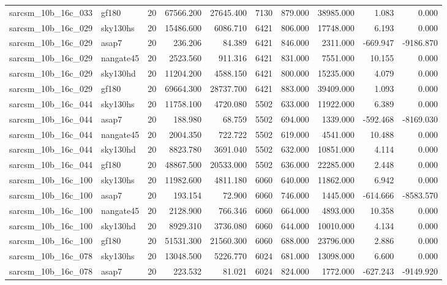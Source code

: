 \begin{longtable}{llrrrrrrrr}
sarcsm\_10b\_16c\_033 & gf180 & 20 & 67566.200 & 27645.400 & 7130 & 879.000 & 38985.000 & 1.083 & 0.000 \\
sarcsm\_10b\_16c\_029 & sky130hs & 20 & 15486.600 & 6086.710 & 6421 & 806.000 & 17748.000 & 6.193 & 0.000 \\
sarcsm\_10b\_16c\_029 & asap7 & 20 & 236.206 & 84.389 & 6421 & 846.000 & 2311.000 & -669.947 & -9186.870 \\
sarcsm\_10b\_16c\_029 & nangate45 & 20 & 2523.560 & 911.316 & 6421 & 831.000 & 7551.000 & 10.155 & 0.000 \\
sarcsm\_10b\_16c\_029 & sky130hd & 20 & 11204.200 & 4588.150 & 6421 & 800.000 & 15235.000 & 4.079 & 0.000 \\
sarcsm\_10b\_16c\_029 & gf180 & 20 & 69664.300 & 28737.700 & 6421 & 883.000 & 39409.000 & 1.093 & 0.000 \\
sarcsm\_10b\_16c\_044 & sky130hs & 20 & 11758.100 & 4720.080 & 5502 & 633.000 & 11922.000 & 6.389 & 0.000 \\
sarcsm\_10b\_16c\_044 & asap7 & 20 & 188.980 & 68.759 & 5502 & 694.000 & 1339.000 & -592.468 & -8169.030 \\
sarcsm\_10b\_16c\_044 & nangate45 & 20 & 2004.350 & 722.722 & 5502 & 619.000 & 4541.000 & 10.488 & 0.000 \\
sarcsm\_10b\_16c\_044 & sky130hd & 20 & 8823.780 & 3691.040 & 5502 & 632.000 & 10851.000 & 4.114 & 0.000 \\
sarcsm\_10b\_16c\_044 & gf180 & 20 & 48867.500 & 20533.000 & 5502 & 636.000 & 22285.000 & 2.448 & 0.000 \\
sarcsm\_10b\_16c\_100 & sky130hs & 20 & 11982.600 & 4811.180 & 6060 & 640.000 & 11862.000 & 6.942 & 0.000 \\
sarcsm\_10b\_16c\_100 & asap7 & 20 & 193.154 & 72.900 & 6060 & 746.000 & 1445.000 & -614.666 & -8583.570 \\
sarcsm\_10b\_16c\_100 & nangate45 & 20 & 2128.900 & 766.346 & 6060 & 664.000 & 4893.000 & 10.358 & 0.000 \\
sarcsm\_10b\_16c\_100 & sky130hd & 20 & 8929.310 & 3736.080 & 6060 & 644.000 & 10010.000 & 4.134 & 0.000 \\
sarcsm\_10b\_16c\_100 & gf180 & 20 & 51531.300 & 21560.300 & 6060 & 688.000 & 23796.000 & 2.886 & 0.000 \\
sarcsm\_10b\_16c\_078 & sky130hs & 20 & 13048.500 & 5226.770 & 6024 & 681.000 & 13098.000 & 6.600 & 0.000 \\
sarcsm\_10b\_16c\_078 & asap7 & 20 & 223.532 & 81.021 & 6024 & 824.000 & 1772.000 & -627.243 & -9149.920 \\

\end{longtable}
